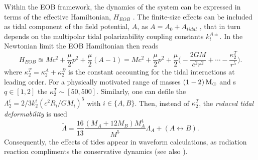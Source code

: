 Within the \ac{EOB} framework, the dynamics of the system can be expressed in terms of the 
effective Hamiltonian, $H_{EOB}$
%
.
The finite-size effects can be included as tidal component of the field potential, $A$, as 
$A = A_0 + A_{tidal}$ \citep{Bini:2012gu}, 
that in turn depends on the multipolar tidal polarizability coupling constants $k_{l}^{A\pm}$.
%
In the Newtonian limit the \ac{EOB} Hamiltonian then reads 
%
\begin{equation}
H_{EOB} \approxeq Mc^2 + \frac{\mu}{2}p^2 + \frac{\mu}{2}(A-1) = Mc^2 + \frac{\mu}{2}p^2 + 
\frac{\mu}{2}\Big( -\frac{2 G M}{c^2 r^2} + \cdots - \frac{\kappa_2^T}{r^5} \Big).
\end{equation}
%
where $\kappa_2^T = \kappa_2^A + \kappa_2^B$ is the constant accounting for the tidal 
interactions at leading order.
%
For a physically motivated range of masses $(1-2)\,{\text{M}_{\odot}}$ and \mr{}s $q\in[1,2]$ the 
$\kappa_2^T\sim[50,500]$. 
%
Similarly, one can defile the $\Lambda_2^i = 2/3 k_2^i (c^2 R_i/GM_i)^5$ with $i\in\{A,B\}$.
Then, instead of $\kappa_2^T$, the \textit{reduced tidal deformability} is used
%
\begin{equation}
\label{eq:intro:Lambda}
\tilde{\Lambda} = \frac{16}{13}\frac{(M_A + 12M_B)M_A^4}{M^5}\Lambda_A + (A\leftrightarrow B).
\end{equation}
%
Consequently, the effects of tides appear in waveform calculations, as radiation reaction 
compliments the conservative dynamics \citep{Damour:2008gu} 
(see also \citet{Damour:2012yf,Banihashemi:2018xfb}).

